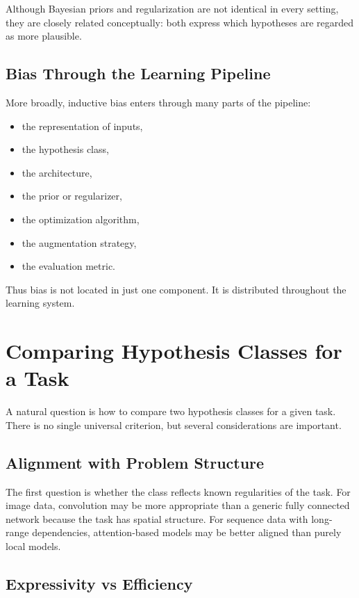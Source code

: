 Although Bayesian priors and regularization are not identical in every setting, they are closely related conceptually: both express which hypotheses are regarded as more plausible.

\subsection{Bias Through the Learning Pipeline}

More broadly, inductive bias enters through many parts of the pipeline:
\begin{itemize}
    \item the representation of inputs,
    \item the hypothesis class,
    \item the architecture,
    \item the prior or regularizer,
    \item the optimization algorithm,
    \item the augmentation strategy,
    \item the evaluation metric.
\end{itemize}

Thus bias is not located in just one component. It is distributed throughout the learning system.

\section{Comparing Hypothesis Classes for a Task}

A natural question is how to compare two hypothesis classes for a given task. There is no single universal criterion, but several considerations are important.

\subsection{Alignment with Problem Structure}

The first question is whether the class reflects known regularities of the task. For image data, convolution may be more appropriate than a generic fully connected network because the task has spatial structure. For sequence data with long-range dependencies, attention-based models may be better aligned than purely local models.

\subsection{Expressivity vs Efficiency}

